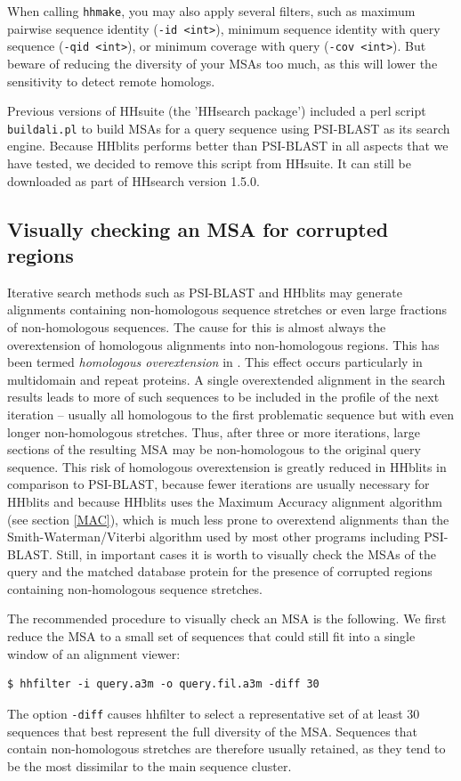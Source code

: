 \documentclass[11pt,a4paper]{article}
\begin{document}
When calling \verb`hhmake`, you may also apply several filters, such as maximum pairwise 
sequence identity (\verb`-id <int>`), minimum sequence identity with query sequence 
(\verb`-qid <int>`), or minimum coverage with query (\verb`-cov <int>`). But beware 
of reducing the diversity of your MSAs too much, as this will lower the sensitivity to
detect remote homologs.

Previous versions of HHsuite (the 'HHsearch package') included a perl script \verb`buildali.pl` to build MSAs for a query sequence using PSI-BLAST as its search engine. Because HHblits performs better than PSI-BLAST in all aspects that we have tested, we decided to remove this script from HHsuite. It can still be downloaded as part of HHsearch version 1.5.0.


\subsection{Visually checking an MSA for corrupted regions}

Iterative search methods such as PSI-BLAST and HHblits may generate alignments containing non-homologous sequence stretches or even large fractions of non-homologous sequences. The cause for this is almost always the overextension of homologous alignments into non-homologous regions. This has been termed \emph{homologous overextension} in \cite{Gonzalez:2010}. This effect occurs particularly in multidomain and repeat proteins. A single overextended alignment in the search results leads to more of such sequences to be included in the profile of the next iteration -- usually all homologous to the first problematic sequence but with even longer non-homologous stretches. Thus, after three or more iterations, large sections of the resulting MSA may be non-homologous to the original query sequence. This risk of homologous overextension is greatly reduced in HHblits in comparison to PSI-BLAST, because fewer iterations are usually necessary for HHblits and because HHblits uses the Maximum Accuracy alignment algorithm (see section \ref{MAC}), which is much less prone to overextend alignments than the Smith-Waterman/Viterbi algorithm used by most other programs including PSI-BLAST. Still, in important cases it is worth to visually check the MSAs of the query and the matched database protein for the presence of corrupted regions containing non-homologous sequence stretches. 

The recommended procedure to visually check an MSA is the following. We first reduce the MSA to a small set of sequences that could still fit into a single window of an alignment viewer:
\begin{verbatim}
$ hhfilter -i query.a3m -o query.fil.a3m -diff 30
\end{verbatim}
The option \verb`-diff` causes hhfilter to select a representative set of at least 30 sequences that best represent the full diversity of the MSA. Sequences that contain non-homologous stretches are therefore usually retained, as they tend to be the most dissimilar to the main sequence cluster. 
\end{document}
